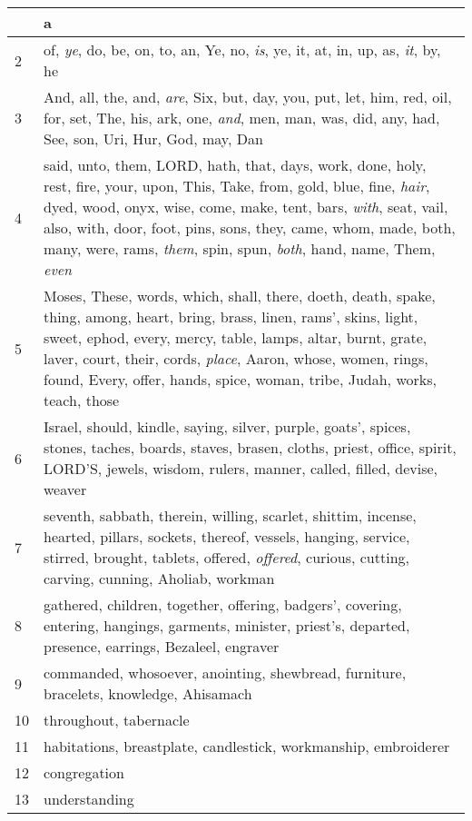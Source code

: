 \begin{longtable}{l|p{3.75in}}
\hline \hline
\endlastfoot
1 & a \\ \hline
2 & of, \emph{ye}, do, be, on, to, an, Ye, no, \emph{is}, ye, it, at, in, up, as, \emph{it}, by, he \\ \hline
3 & And, all, the, and, \emph{are}, Six, but, day, you, put, let, him, red, oil, for, set, The, his, ark, one, \emph{and}, men, man, was, did, any, had, See, son, Uri, Hur, God, may, Dan \\ \hline
4 & said, unto, them, LORD, hath, that, days, work, done, holy, rest, fire, your, upon, This, Take, from, gold, blue, fine, \emph{hair}, dyed, wood, onyx, wise, come, make, tent, bars, \emph{with}, seat, vail, also, with, door, foot, pins, sons, they, came, whom, made, both, many, were, rams, \emph{them}, spin, spun, \emph{both}, hand, name, Them, \emph{even} \\ \hline
5 & Moses, These, words, which, shall, there, doeth, death, spake, thing, among, heart, bring, brass, linen, rams', skins, light, sweet, ephod, every, mercy, table, lamps, altar, burnt, grate, laver, court, their, cords, \emph{place}, Aaron, whose, women, rings, found, Every, offer, hands, spice, woman, tribe, Judah, works, teach, those \\ \hline
6 & Israel, should, kindle, saying, silver, purple, goats', spices, stones, taches, boards, staves, brasen, cloths, priest, office, spirit, LORD'S, jewels, wisdom, rulers, manner, called, filled, devise, weaver \\ \hline
7 & seventh, sabbath, therein, willing, scarlet, shittim, incense, hearted, pillars, sockets, thereof, vessels, hanging, service, stirred, brought, tablets, offered, \emph{offered}, curious, cutting, carving, cunning, Aholiab, workman \\ \hline
8 & gathered, children, together, offering, badgers', covering, entering, hangings, garments, minister, priest's, departed, presence, earrings, Bezaleel, engraver \\ \hline
9 & commanded, whosoever, anointing, shewbread, furniture, bracelets, knowledge, Ahisamach \\ \hline
10 & throughout, tabernacle \\ \hline
11 & habitations, breastplate, candlestick, workmanship, embroiderer \\ \hline
12 & congregation \\ \hline
13 & understanding \\ \hline
\end{longtable}






